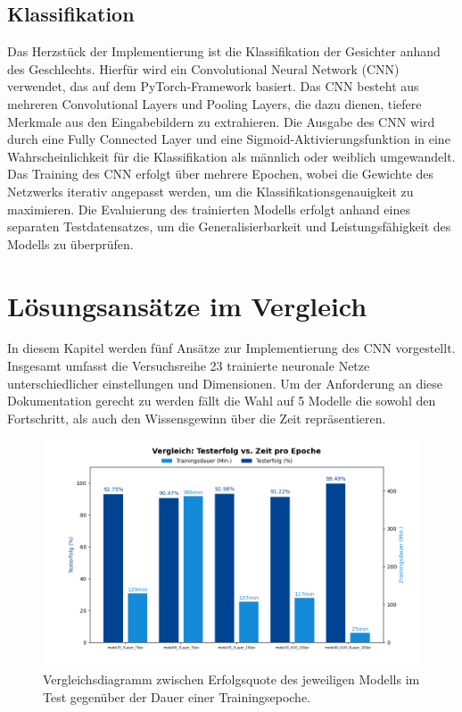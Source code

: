 \documentclass[journal,twoside,web]{ieeecolor}
\begin{document}
\subsection{Klassifikation}
Das Herzstück der Implementierung ist die Klassifikation der Gesichter anhand des Geschlechts. Hierfür wird ein Convolutional Neural Network (CNN) verwendet, das auf dem PyTorch-Framework basiert. Das CNN besteht aus mehreren Convolutional Layers und Pooling Layers, die dazu dienen, tiefere Merkmale aus den Eingabebildern zu extrahieren. Die Ausgabe des CNN wird durch eine Fully Connected Layer und eine Sigmoid-Aktivierungsfunktion in eine Wahrscheinlichkeit für die Klassifikation als männlich oder weiblich umgewandelt. Das Training des CNN erfolgt über mehrere Epochen, wobei die Gewichte des Netzwerks iterativ angepasst werden, um die Klassifikationsgenauigkeit zu maximieren. Die Evaluierung des trainierten Modells erfolgt anhand eines separaten Testdatensatzes, um die Generalisierbarkeit und Leistungsfähigkeit des Modells zu überprüfen.



\section{Lösungsansätze im Vergleich}
In diesem Kapitel werden fünf Ansätze zur Implementierung des CNN vorgestellt. Insgesamt umfasst die Versuchsreihe 23 trainierte neuronale Netze unterschiedlicher einstellungen und Dimensionen.
Um der Anforderung an diese Dokumentation gerecht zu werden fällt die Wahl auf 5 Modelle die sowohl den Fortschritt, als auch den Wissensgewinn über die Zeit repräsentieren.

\begin{figure}[H]
    \centerline{\includegraphics[width=\columnwidth]{Erfolg_Dauer.png}}
    \caption{Vergleichsdiagramm zwischen Erfolgsquote des jeweiligen Modells im Test gegenüber der Dauer einer Trainingsepoche.}
    \label{fig:compareGraph}
\end{figure}
\end{document}

